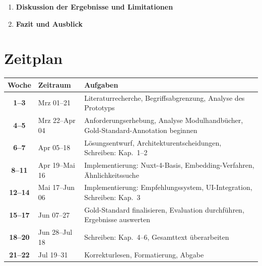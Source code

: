 \documentclass[12pt,a4paper]{article}
\begin{document}
\begin{enumerate}[leftmargin=1.5em, itemsep=1pt, parsep=0pt]
\begin{enumerate}[leftmargin=1.5em, itemsep=0pt, parsep=0pt, topsep=2pt]
      \item Aufbau des Gold-Standard-Datensatzes (LLM-gest\"utzte Vorannotation und manuelle Validierung)
      \item Methodik der vergleichenden Evaluation (regelbasiert, Embedding, hybrid)
      \item Ergebnisse der Satzklassifikation und Taxonomie-Zuordnung
      \item Ergebnisse der \"ahnlichkeitsbasierten Empfehlungen (Precision@k)
    \end{enumerate}
  \item \textbf{Diskussion der Ergebnisse und Limitationen}
  \item \textbf{Fazit und Ausblick}
\end{enumerate}

\section{Zeitplan}

\begin{table}[H]
\centering
\small
\begin{tabular}{>{\bfseries}c l p{8.5cm}}
  \toprule
  Woche & Zeitraum & Aufgaben \\
  \midrule
  1--3   & Mrz 01--21     & Literaturrecherche, Begriffsabgrenzung, Analyse des Prototyps \\
  4--5   & Mrz 22--Apr 04 & Anforderungserhebung, Analyse Modulhandb\"ucher, Gold-Standard-Annotation beginnen \\
  6--7   & Apr 05--18     & L\"osungsentwurf, Architekturentscheidungen, Schreiben: Kap.\ 1--2 \\
  8--11  & Apr 19--Mai 16 & Implementierung: Nuxt-4-Basis, Embedding-Verfahren, \"Ahnlichkeitssuche \\
  12--14 & Mai 17--Jun 06 & Implementierung: Empfehlungssystem, UI-Integration, Schreiben: Kap.\ 3 \\
  15--17 & Jun 07--27     & Gold-Standard finalisieren, Evaluation durchf\"uhren, Ergebnisse auswerten \\
  18--20 & Jun 28--Jul 18 & Schreiben: Kap.\ 4--6, Gesamttext \"uberarbeiten \\
  21--22 & Jul 19--31     & Korrekturlesen, Formatierung, Abgabe \\
  \bottomrule
\end{tabular}
\end{table}

\renewcommand{\refname}{Ausgangsliteratur}
\end{document}
